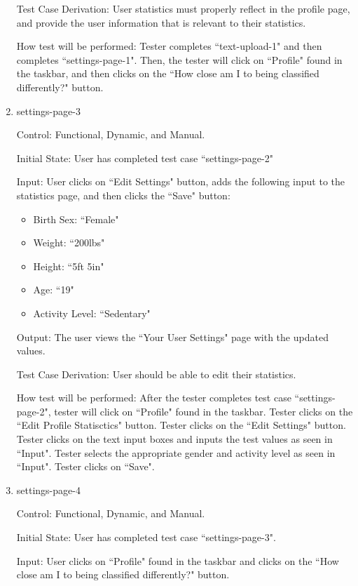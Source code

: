 \documentclass[12pt, titlepage]{article}
\begin{document}
\begin{enumerate}
		Test Case Derivation: User statistics must properly reflect in the profile page, and provide the user information that is relevant to their statistics.
		
		How test will be performed: Tester completes ``text-upload-1" and then completes ``settings-page-1". Then, the tester will click on ``Profile" found in the taskbar, and then clicks on the ``How close am I to being classified differently?" button.
		
		\item{settings-page-3\\}
		
		Control: Functional, Dynamic, and Manual.
		
		Initial State: User has completed test case ``settings-page-2"
		
		Input: User clicks on ``Edit Settings" button, adds the following input to the statistics page, and then clicks the ``Save" button:
		
		\begin{itemize}
			\item Birth Sex: ``Female"
			\item Weight: ``200lbs"
			\item Height: ``5ft 5in"
			\item Age: ``19"
			\item Activity Level: ``Sedentary"
		\end{itemize}
		
		Output: The user views the ``Your User Settings" page with the updated values.
		
		Test Case Derivation: User should be able to edit their statistics.
		
		How test will be performed: After the tester completes test case ``settings-page-2", tester will click on ``Profile" found in the taskbar. Tester clicks on the ``Edit Profile Statisctics" button. Tester clicks on the ``Edit Settings" button. Tester clicks on the text input boxes and inputs the test values as seen in ``Input". Tester selects the appropriate gender and activity level as seen in ``Input". Tester clicks on ``Save".
		
		\item{settings-page-4\\}
		
		Control: Functional, Dynamic, and Manual.
		
		Initial State: User has completed test case ``settings-page-3".
		
		Input: User clicks on ``Profile" found in the taskbar and clicks on the ``How close am I to being classified differently?" button.
		

\end{enumerate}
\end{document}
